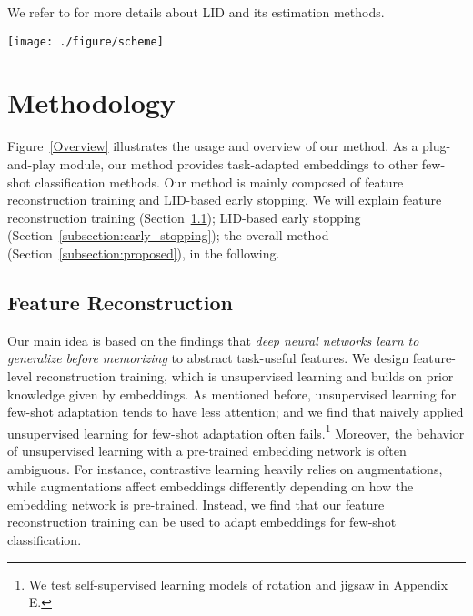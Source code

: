 \documentclass{article}
\begin{document}
We refer to \citet{Amsaleg15, Houle17a, Houle17b} for more details about LID and its estimation methods.   \begin{figure*}[ht]
	\vskip -0.1in
	\begin{center}
		\centerline{\texttt{[image: ./figure/scheme]}}
		\vskip -0.15in
		\caption{
			Overview of our method.
			1-(a) shows the case without embedding adaptation, and 1-(b) shows the case with embedding adaptation.
			Our scheme mainly consists of \textit{feature reconstruction training} and \textit{dimensionality-driven early stopping}, and provides new embeddings of generalizable features for the downstream few-shot task.
	}
		\label{Overview}
	\end{center}
	\vskip -0.3in
\end{figure*}
\section{Methodology}
Figure~\ref{Overview} illustrates the usage and overview of our method.
As a plug-and-play module, our method provides task-adapted embeddings to other few-shot classification methods.
Our method is mainly composed of feature reconstruction training and LID-based early stopping.
We will explain feature reconstruction training (Section~\ref{subsection:feature_reconstruction}); LID-based early stopping (Section~\ref{subsection:early_stopping}); the overall method (Section~\ref{subsection:proposed}), in the following.

\subsection{Feature Reconstruction}
\label{subsection:feature_reconstruction}
Our main idea is based on the findings that \textit{deep neural networks learn to generalize before memorizing} to abstract task-useful features. We design feature-level reconstruction training, which is unsupervised learning and builds on prior knowledge given by embeddings. As mentioned before, unsupervised learning for few-shot adaptation tends to have less attention; and we find that naively applied unsupervised learning for few-shot adaptation often fails.\footnote{We test self-supervised learning models of  rotation \cite{Rotnet} and jigsaw \cite{jigsaw} in Appendix E.} Moreover, the behavior of unsupervised learning with a pre-trained embedding network is often ambiguous. For instance, contrastive learning heavily relies on augmentations, while augmentations affect embeddings differently depending on how the embedding network is pre-trained. Instead, we find that our feature reconstruction training can be used to adapt embeddings for few-shot classification.
\end{document}
